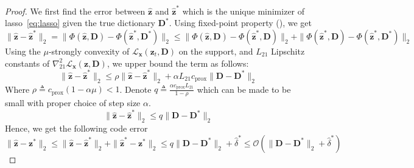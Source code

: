 \documentclass[10pt]{article} %
\newcommand{\D}{{\bm D}}
\newcommand{\x}{{\bm x}}
\newcommand{\z}{{\bm z}}
\newcommand{\Loss}{\mathcal{L}}
\begin{document}
%
%
\fwdzglobal*
%
\begin{proof}
We first find the error between $\hat \z$ and $\hat \z^{\ast}$ which is the unique minimizer of lasso~\eqref{eq:lasso} given the true dictionary $\D^{\ast}$. Using fixed-point property (), we get
\begin{equation}
\| \hat \z - \hat \z^{\ast} \|_2 = \| \Phi(\hat \z, \D) - \Phi(\hat \z^{\ast}, \D^{\ast}) \|_2 \leq  \| \Phi(\hat \z, \D) - \Phi(\hat \z^{\ast}, \D) \|_2 +  \| \Phi(\hat \z^{\ast}, \D) - \Phi(\hat \z^{\ast}, \D^{\ast}) \|_2
\end{equation}
Using the $\mu$-strongly convexity of $\Loss_{\x}(\z_t, \D)$ on the support, and $L_{21}$ Lipschitz constants of $\nabla_{21}^2\Loss_{\x}(\z, \D)$, we upper bound the term as follows:
\begin{equation}
\| \hat \z - \hat \z^{\ast} \|_2 \leq \rho \| \hat \z - \hat \z^{\ast} \|_2 + \alpha L_{21} c_{\text{prox}} \| \D - \D^{\ast} \|_2
\end{equation}
Where $\rho \triangleq  c_{\text{prox}} (1-\alpha\mu) < 1$. Denote $q \triangleq \frac{\alpha c_{\text{prox}} L_{21}}{1 - \rho}$ which can be made to be small with proper choice of step size $\alpha$.
\begin{equation}
\| \hat \z - \hat \z^{\ast} \|_2 \leq q \| \D - \D^{\ast} \|_2
\end{equation}
Hence, we get the following code error
\begin{equation}
\| \hat \z - \z^{\ast} \|_2 \leq \| \hat \z - \hat \z^{\ast} \|_2 + \| \hat \z^{\ast} - \z^{\ast} \|_2 \leq q \| \D - \D^{\ast} \|_2 + \hat \delta^{\ast}  \leq \mathcal{O}(\| \D - \D^{\ast} \|_2 + \hat \delta^{\ast})
\end{equation}
\end{proof}
%
\fwdjglobal*
%
\end{document}
